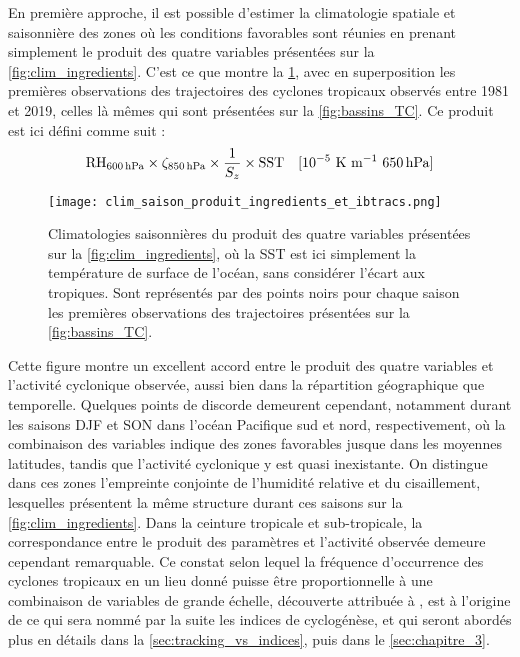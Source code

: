 \documentclass[../main.tex]{subfiles}
\begin{document}
En première approche, il est possible d'estimer la climatologie spatiale et saisonnière des zones où les conditions favorables sont réunies en prenant
simplement le produit des quatre variables présentées sur la \cref{fig:clim_ingredients}. C'est ce que montre la \cref{fig:produit_ingredients}, avec en
superposition les premières observations des trajectoires des cyclones tropicaux observés entre 1981 et 2019, celles là mêmes qui sont présentées sur la
\cref{fig:bassins_TC}. Ce produit est ici défini comme suit :
\begin{equation*}
    \text{RH}_{\hPa{600}} \times \zeta_{\hPa{850}} \times \frac{1}{S_z} \times \text{SST} \quad \text{[$10^{-5}$ K m$^{-1}$ \hPa{650}}]
\end{equation*}
\begin{figure}[tbp]
    \centering
    \texttt{[image: clim\_saison\_produit\_ingredients\_et\_ibtracs.png]}
    \caption{Climatologies saisonnières du produit des quatre variables présentées sur la \cref{fig:clim_ingredients}, où la SST est ici simplement la
    température de surface de l'océan, sans considérer l'écart aux tropiques. Sont représentés par des points noirs pour chaque saison les premières
    observations des trajectoires présentées sur la \cref{fig:bassins_TC}.}
    \label{fig:produit_ingredients}
\end{figure}
\noindent Cette figure montre un excellent accord entre le produit des quatre variables et l'activité cyclonique observée, aussi bien dans la répartition
géographique que temporelle. Quelques points de discorde demeurent cependant, notamment durant les saisons DJF et SON dans l'océan Pacifique sud et nord,
respectivement, où la combinaison des variables indique des zones favorables jusque dans les moyennes latitudes, tandis que l'activité cyclonique y est quasi
inexistante. On distingue dans ces zones l'empreinte conjointe de l'humidité relative et du cisaillement, lesquelles présentent la même structure durant ces
saisons sur la \cref{fig:clim_ingredients}. Dans la ceinture tropicale et sub-tropicale, la correspondance entre le produit des paramètres et l'activité
observée demeure cependant remarquable. Ce constat selon lequel la fréquence d'occurrence des cyclones tropicaux en un lieu donné puisse être proportionnelle à
une combinaison de variables de grande échelle, découverte attribuée à \cite{gray_tropical_1975}, est à l'origine de ce qui sera nommé par la suite les indices
de cyclogénèse, et qui seront abordés plus en détails dans la \cref{sec:tracking_vs_indices}, puis dans le \cref{sec:chapitre_3}.
\end{document}
